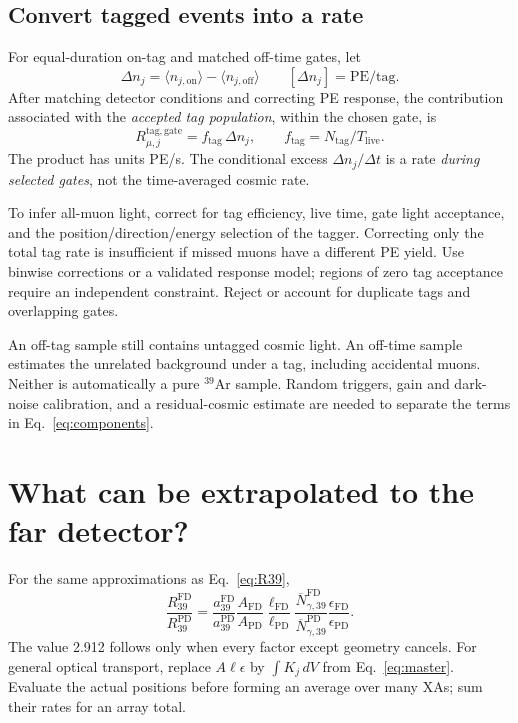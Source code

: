 \documentclass[11pt]{article}
\begin{document}


\subsection{Convert tagged events into a rate}

For equal-duration on-tag and matched off-time gates, let
\begin{equation}
\Delta n_j=\langle n_{j,\mathrm{on}}\rangle
-\langle n_{j,\mathrm{off}}\rangle
\qquad [\Delta n_j]=\mathrm{PE/tag}.
\end{equation}
After matching detector conditions and correcting PE response, the
contribution associated with the \emph{accepted tag population}, within the
chosen gate, is
\begin{equation}
\boxed{R_{\mu,j}^{\mathrm{tag,gate}}
=f_{\mathrm{tag}}\,\Delta n_j,\qquad
f_{\mathrm{tag}}=N_{\mathrm{tag}}/T_{\mathrm{live}}.}
\label{eq:CRT}
\end{equation}
The product has units PE/s. The conditional excess $\Delta n_j/\Delta t$
is a rate \emph{during selected gates}, not the time-averaged cosmic rate.

To infer all-muon light, correct for tag efficiency, live time, gate light
acceptance, and the position/direction/energy selection of the tagger.
Correcting only the total tag rate is insufficient if missed muons have a
different PE yield. Use binwise corrections or a validated response model;
regions of zero tag acceptance require an independent constraint. Reject or
account for duplicate tags and overlapping gates.

An off-tag sample still contains untagged cosmic light. An off-time sample
estimates the unrelated background under a tag, including accidental muons.
Neither is automatically a pure $^{39}$Ar sample. Random triggers, gain and
dark-noise calibration, and a residual-cosmic estimate are needed to separate
the terms in Eq.~\eqref{eq:components}.

\section{What can be extrapolated to the far detector?}

For the same approximations as Eq.~\eqref{eq:R39},
\begin{equation}
\frac{R_{39}^{\mathrm{FD}}}{R_{39}^{\mathrm{PD}}}
=\frac{a_{39}^{\mathrm{FD}}}{a_{39}^{\mathrm{PD}}}
\frac{A_{\mathrm{FD}}}{A_{\mathrm{PD}}}
\frac{\ell_{\mathrm{FD}}}{\ell_{\mathrm{PD}}}
\frac{\overline N_{\gamma,39}^{\mathrm{FD}}}{\overline N_{\gamma,39}^{\mathrm{PD}}}
\frac{\epsilon_{\mathrm{FD}}}{\epsilon_{\mathrm{PD}}}.
\label{eq:scaling}
\end{equation}
The value 2.912 follows only when every factor except geometry cancels.
For general optical transport, replace $A\ell\epsilon$ by
$\int K_j\,dV$ from Eq.~\eqref{eq:master}. Evaluate the actual positions
before forming an average over many XAs; sum their rates for an array total.
\end{document}
